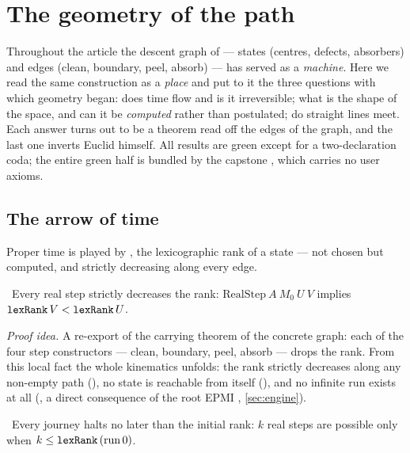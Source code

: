 \section{The geometry of the path}\label{sec:geometry}

Throughout the article the descent graph of  --- states (centres, defects,
absorbers) and edges (clean, boundary, peel, absorb) --- has served as a \emph{machine}. Here we
read the same construction as a \emph{place} and put to it the three questions with which geometry
began: does time flow and is it irreversible; what is the shape of the space, and can it be
\emph{computed} rather than postulated; do straight lines meet. Each answer turns out to be a
theorem read off the edges of the graph, and the last one inverts Euclid himself. All results are
green except for a two-declaration coda; the entire green half is bundled by the capstone
, which carries no user axioms.

\subsection{The arrow of time}

Proper time is played by , the lexicographic rank of a state --- not chosen but
computed, and strictly decreasing along every edge.

\begin{theorem}\label{thm:timeArrow_step}
\green{}\ Every real step strictly decreases the rank: $\mathrm{RealStep}\ A\ M_0\ U\ V$ implies
$\texttt{lexRank}\,V < \texttt{lexRank}\,U$. 
\end{theorem}

\emph{Proof idea.} A re-export of the carrying theorem of the concrete graph: each of the four step
constructors --- clean, boundary, peel, absorb --- drops the rank. From this local fact the whole
kinematics unfolds: the rank strictly decreases along any non-empty path (),
no state is reachable from itself (), and no infinite run exists at all
(, a direct consequence of the root EPMI ,
\cref{sec:engine}).

\begin{theorem}\label{thm:every_journey_halts}
\green{}\ Every journey halts no later than the initial rank: $k$ real steps are possible only when
$k \le \texttt{lexRank}\,(\mathrm{run}\,0)$. 
\end{theorem}

